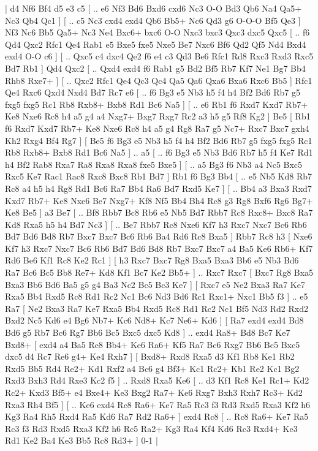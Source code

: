 \makegametitle 
|   d4   Nf6    Bf4   d5    e3  c5 [ .. e6  Nf3 Bd6  Bxd6 cxd6  Nc3 O-O  Bd3 Qb6  Na4 Qa5+  Nc3 Qb4  Qc1   ]  [ .. c5  Nc3 cxd4  exd4 Qb6  Bb5+ Nc6  Qd3 g6  O-O-O Bf5  Qe3   ]  Nf3   Nc6   Bb5   Qa5+    Nc3   Ne4    Bxc6+   bxc6    O-O   Nxc3    bxc3   Qxc3    dxc5   Qxc5 [ .. f6  Qd4 Qxc2  Rfc1 Qe4  Rab1 e5  Bxe5 fxe5  Nxe5 Be7  Nxc6 Bf6  Qd2 Qf5  Nd4 Bxd4  exd4 O-O  c6   ]  [ .. Qxc5  c4 dxc4  Qe2 f6  e4 c3  Qd3 Be6  Rfc1 Rd8  Rxc3 Rxd3  Rxc5 Bd7  Rb1   ]  Qd4   Qxc2 [ .. Qxd4  exd4 f6  Rab1 g5  Bd2 Bf5  Rb7 Kf7  Ne1 Bg7  Bb4 Rhb8  Rxe7+   ]  [ .. Qxc2  Rfc1 Qe4  Qc3 Qc4  Qa5 Qa6  Qxa6 Bxa6  Rxc6 Bb5   ]  Rfc1   Qe4    Rxc6   Qxd4    Nxd4   Bd7    Rc7   e6 [ .. f6  Bg3 e5  Nb3 h5  f4 h4  Bf2 Bd6  Rb7 g5  fxg5 fxg5  Rc1 Rb8  Rxb8+ Bxb8  Rd1 Bc6  Na5   ]  [ .. e6  Rb1 f6  Rxd7 Kxd7  Rb7+ Ke8  Nxe6 Rc8  h4 a5  g4 a4  Nxg7+ Bxg7  Rxg7 Rc2  a3 h5  g5 Rf8  Kg2   ]  Be5 [  Rb1 f6  Rxd7 Kxd7  Rb7+ Ke8  Nxe6 Rc8  h4 a5  g4 Rg8  Ra7 g5  Nc7+ Rxc7  Bxc7 gxh4  Kh2 Rxg4  Bf4 Rg7   ]  [  Be5 f6  Bg3 e5  Nb3 h5  f4 h4  Bf2 Bd6  Rb7 g5  fxg5 fxg5  Rc1 Rb8  Rxb8+ Bxb8  Rd1 Bc6  Na5   ] .. a5 [ .. f6  Bg3 e5  Nb3 Bd6  Rb7 h5  f4 Ke7  Rd1 h4  Bf2 Rab8  Rxa7 Ra8  Rxa8 Rxa8  fxe5 Bxe5   ]  [ .. a5  Bg3 f6  Nb3 a4  Nc5 Bxc5  Rxc5 Ke7  Rac1 Rac8  Rxc8 Bxc8  Rb1 Bd7   ]  Rb1   f6    Bg3   Bb4 [ .. e5  Nb5 Kd8  Rb7 Rc8  a4 h5  h4 Rg8  Rd1 Bc6  Ra7 Bb4  Ra6 Bd7  Rxd5 Ke7   ]  [ .. Bb4  a3 Bxa3  Rxd7 Kxd7  Rb7+ Ke8  Nxe6 Be7  Nxg7+ Kf8  Nf5 Bb4  Bh4 Rc8  g3 Rg8  Bxf6 Rg6  Bg7+ Ke8  Be5   ]  a3   Be7 [ .. Bf8  Rbb7 Bc8  Rb6 e5  Nb5 Bd7  Rbb7 Rc8  Rxc8+ Bxc8  Ra7 Kd8  Rxa5 h5  h4 Bd7  Nc3   ]  [ .. Be7  Rbb7 Rc8  Nxe6 Kf7  h3 Rxc7  Nxc7 Bc6  Rb6 Bd7  Bd6 Bd8  Rb7 Bxc7  Bxc7 Bc6  Rb6 Ba4  Rd6 Rc8  Bxa5   ]  Rbb7   Rc8    h3 [  Nxe6 Kf7  h3 Rxc7  Nxc7 Bc6  Rb6 Bd7  Bd6 Bd8  Rb7 Bxc7  Bxc7 a4  Ba5 Ke6  Rb6+ Kf7  Rd6 Be6  Kf1 Rc8  Ke2 Rc1   ]  [  h3 Rxc7  Bxc7 Rg8  Bxa5 Bxa3  Bb6 e5  Nb3 Bd6  Ra7 Bc6  Bc5 Bb8  Re7+ Kd8  Kf1 Bc7  Ke2 Bb5+   ] .. Rxc7    Rxc7 [  Bxc7 Rg8  Bxa5 Bxa3  Bb6 Bd6  Ba5 g5  g4 Ba3  Nc2 Bc5  Bc3 Ke7   ]  [  Rxc7 e5  Ne2 Bxa3  Ra7 Ke7  Rxa5 Bb4  Rxd5 Rc8  Rd1 Rc2  Nc1 Bc6  Nd3 Bd6  Rc1 Rxc1+  Nxc1 Bb5  f3   ] .. e5    Ra7 [  Ne2 Bxa3  Ra7 Ke7  Rxa5 Bb4  Rxd5 Rc8  Rd1 Rc2  Nc1 Bf5  Nd3 Rd2  Rxd2 Bxd2  Nc5 Kd6  e4 Bg6  Nb7+ Kc6  Nd8+ Kc7  Ne6+ Kd6   ]  [  Ra7 exd4  exd4 Bd8  Bd6 g5  Rb7 Bc6  Rg7 Bb6  Bc5 Bxc5  dxc5 Kd8   ] .. exd4    Ra8+   Bd8    Bc7   Ke7    Bxd8+ [  exd4 a4  Ba5 Re8  Bb4+ Ke6  Ra6+ Kf5  Ra7 Bc6  Rxg7 Bb6  Bc5 Bxc5  dxc5 d4  Rc7 Re6  g4+ Ke4  Rxh7   ]  [  Bxd8+ Rxd8  Rxa5 d3  Kf1 Rb8  Ke1 Rb2  Rxd5 Bb5  Rd4 Re2+  Kd1 Rxf2  a4 Bc6  g4 Bf3+  Kc1 Rc2+  Kb1 Re2  Kc1 Bg2  Rxd3 Bxh3  Rd4 Rxe3  Kc2 f5   ] .. Rxd8    Rxa5   Ke6 [ .. d3  Kf1 Rc8  Ke1 Rc1+  Kd2 Rc2+  Kxd3 Bf5+  e4 Bxe4+  Ke3 Bxg2  Ra7+ Ke6  Rxg7 Bxh3  Rxh7 Rc3+  Kd2 Rxa3  Rh4 Bf5   ]  [ .. Ke6  exd4 Rc8  Ra6+ Ke7  Ra5 Rc3  f3 Rd3  Rxd5 Rxa3  Kf2 h6  Kg3 Ra4  Rh5 Rxd4  Ra5 Kd6  Ra7 Rd2  Ra6+   ]  exd4   Rc8    [ .. Rc8  Ra6+ Ke7  Ra5 Rc3  f3 Rd3  Rxd5 Rxa3  Kf2 h6  Rc5 Ra2+  Kg3 Ra4  Kf4 Kd6  Rc3 Rxd4+  Ke3 Rd1  Ke2 Ba4  Ke3 Bb5  Rc8 Rd3+   ] 0-1  |
